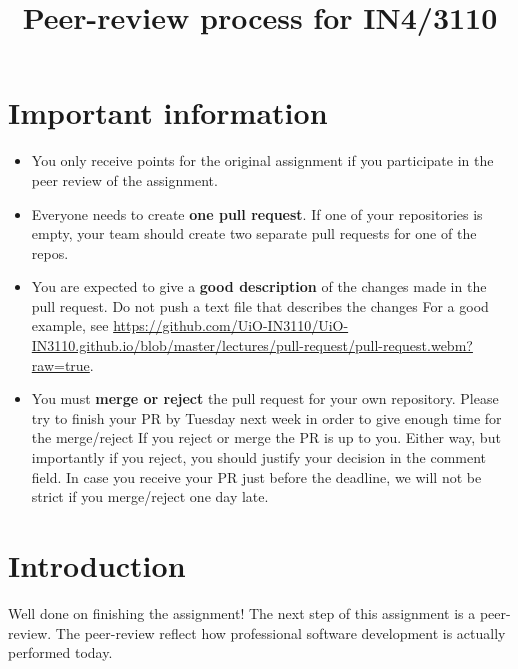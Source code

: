 \documentclass[a4paper]{article}
\title{Peer-review process for IN4/3110}
\begin{document}
\maketitle

\section{Important information}
\begin{itemize}
    \item You only receive points for the original assignment if you participate in the peer review of the assignment.
    \item Everyone needs to create \textbf{one pull request}.
    If one of your repositories is empty, your team should create two separate pull requests for one of the repos.
    \item You are expected to give a \textbf{good description} of the changes made in the pull request.
    \subitem Do not push a text file that describes the changes
    \subitem For a good example, see \url{https://github.com/UiO-IN3110/UiO-IN3110.github.io/blob/master/lectures/pull-request/pull-request.webm?raw=true}.
    \item You must \textbf{merge or reject} the pull request for your own repository.
    \subitem Please try to finish your PR by Tuesday next week in order to give enough time for the merge/reject
    \subitem If you reject or merge the PR is up to you.
    Either way, but importantly if you reject, you should justify your decision in the comment field.
    \subitem In case you receive your PR just before the deadline, we will not be strict if you merge/reject one day late.
\end{itemize}


\section{Introduction}

Well done on finishing the assignment!
The next step of this assignment is a peer-review. The peer-review reflect how professional software development is actually performed today. 
\end{document}
